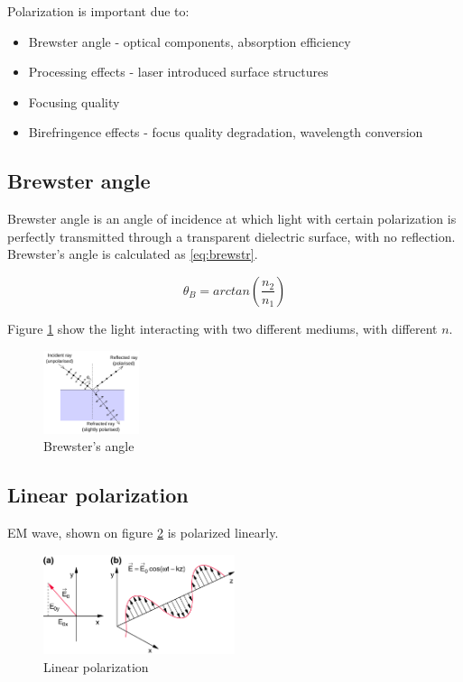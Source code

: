 Polarization is important due to:
\begin{itemize}
    \item Brewster angle - optical components, absorption efficiency
    \item Processing effects - laser introduced surface structures
    \item Focusing quality
    \item Birefringence effects - focus quality degradation, wavelength conversion
\end{itemize}

\subsection{Brewster angle}
Brewster angle is an angle of incidence at which light with certain polarization is 
perfectly transmitted through a transparent dielectric surface, with no reflection.
Brewster's angle is calculated as \ref{eq:brewstr}. 

\begin{equation}
    \theta_B = arctan(\frac{n_2}{n_1})
    \label{eq:brewstr}
\end{equation}

Figure \ref{fig:brewstr} show the light interacting with two different mediums, with different $n$.
\begin{figure}[h!]
    \centering
    \includegraphics[width=0.25\textwidth]{slike/Brewsters-angle.svg.png}
    \caption{Brewster's angle }
    \label{fig:brewstr}
\end{figure}

\subsection{Linear polarization}
EM wave, shown on figure \ref{fig:linpol} is polarized linearly. 

\begin{figure}[h!]
    \centering
    \includegraphics[width=0.5\textwidth]{slike/linpol.png}
    \caption{Linear polarization}
    \label{fig:linpol}
\end{figure}

